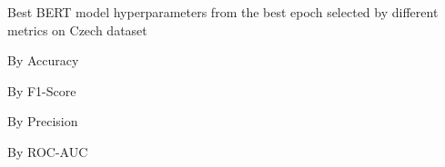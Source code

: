 \begin{table}[!htbp]
    \caption{Best BERT model hyperparameters from the best epoch selected by different metrics on Czech dataset}
    \label{tab:czech_bert_hparams}
    \centering

    \begin{subtable}[t]{0.48\linewidth}
        \scriptsize
        \caption{By Accuracy}
        
    \end{subtable}
    \hfill
    \begin{subtable}[t]{0.48\linewidth}
        \scriptsize
        \caption{By F1-Score}
        
    \end{subtable}

    \vspace{1em}

    \begin{subtable}[t]{0.48\linewidth}
        \scriptsize
        \caption{By Precision}
        
    \end{subtable}
    \hfill
    \begin{subtable}[t]{0.48\linewidth}
        \scriptsize
        \caption{By ROC-AUC}
        
    \end{subtable}


\end{table}